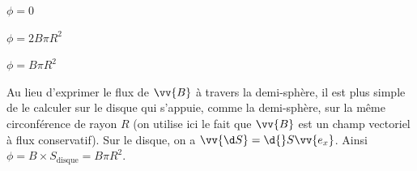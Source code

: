 
\begin{enonce}
\begin{listeQCM3Colonnes}
		\item $\phi=0$
		\item $\phi=2B\pi R^2$
		\item $\phi=B\pi R^2$
\end{listeQCM3Colonnes}
\end{enonce}

\reponse{$\reponseC{}$}

\begin{corrige}
Au lieu d'exprimer le flux de $\vv{B}$ à travers la demi-sphère, il est plus simple de le calculer sur le disque qui s'appuie, comme la demi-sphère, sur la même circonférence de rayon $R$ (on utilise ici le fait que $\vv{B}$ est un champ vectoriel à flux conservatif).  
Sur le disque, on a $\vv{\d S}=\d{}S \vv{e_x}$. Ainsi $\phi=B \times S_{\text{disque}} = B \pi R^{2}$.
\end{corrige}


\finEntrainement







\hauteurLargeurCadreReponse		{11mm}{5cm}
\initialisationEntrainement

\debutEntrainement



